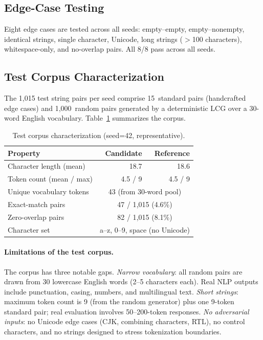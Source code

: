 \documentclass[11pt]{article}
\begin{document}
\subsection{Edge-Case Testing}

Eight edge cases are tested across all seeds:
empty--empty, empty--nonempty, identical strings, single character,
Unicode, long strings ($>$100 characters), whitespace-only, and
no-overlap pairs.  All 8/8 pass across all seeds.

\subsection{Test Corpus Characterization}

The 1{,}015 test string pairs per seed comprise 15~standard pairs
(handcrafted edge cases) and 1{,}000~random pairs generated by a
deterministic LCG over a 30-word English vocabulary.
Table~\ref{tab:corpus} summarizes the corpus.

\begin{table}[t]
\centering
\caption{Test corpus characterization (seed=42, representative).}\label{tab:corpus}
\smallskip
\begin{tabular}{@{}lrr@{}}
\toprule
\textbf{Property} & \textbf{Candidate} & \textbf{Reference} \\
\midrule
Character length (mean) & 18.7 & 18.6 \\
Token count (mean / max) & 4.5 / 9 & 4.5 / 9 \\
Unique vocabulary tokens & \multicolumn{2}{c}{43 (from 30-word pool)} \\
Exact-match pairs & \multicolumn{2}{c}{47 / 1{,}015 (4.6\%)} \\
Zero-overlap pairs & \multicolumn{2}{c}{82 / 1{,}015 (8.1\%)} \\
Character set & \multicolumn{2}{c}{a--z, 0--9, space (no Unicode)} \\
\bottomrule
\end{tabular}
\end{table}

\paragraph{Limitations of the test corpus.}
The corpus has three notable gaps.
\emph{Narrow vocabulary}: all random pairs are drawn from 30 lowercase
English words (2--5 characters each).  Real NLP outputs include
punctuation, casing, numbers, and multilingual text.
\emph{Short strings}: maximum token count is 9 (from the random generator)
plus one 9-token standard pair; real evaluation involves 50--200-token responses.
\emph{No adversarial inputs}: no Unicode edge cases (CJK, combining characters, RTL),
no control characters, and no strings designed to stress tokenization boundaries.
\end{document}
